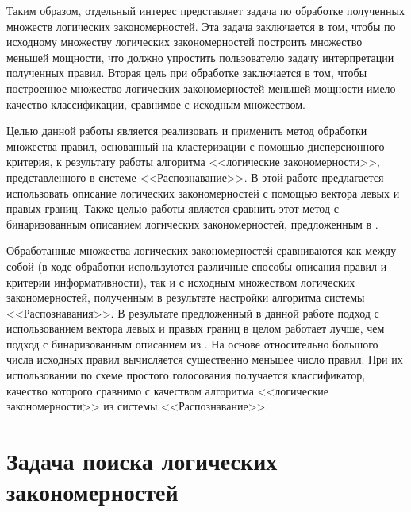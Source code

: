 \documentclass[12pt]{article}
\begin{document}
Таким образом, отдельный интерес представляет задача по обработке
полученных множеств логических закономерностей. Эта задача заключается
в том, чтобы по исходному множеству логических закономерностей
построить множество меньшей мощности, что должно упростить
пользователю задачу интерпретации полученных правил. Вторая цель при
обработке заключается в том, чтобы построенное множество логических
закономерностей меньшей мощности имело качество классификации,
сравнимое с исходным множеством.

Целью данной работы является реализовать и применить метод обработки
множества правил, основанный на кластеризации с помощью дисперсионного
критерия, к результату работы алгоритма <<логические закономерности>>,
представленного в системе <<Распознавание>>. В этой работе
предлагается использовать описание логических закономерностей с
помощью вектора левых и правых границ. Также целью работы является
сравнить этот метод с бинаризованным описанием логических
закономерностей, предложенным в \cite{novikov15}.

Обработанные множества логических закономерностей сравниваются как
между собой (в ходе обработки используются различные способы описания
правил и критерии информативности), так и с исходным множеством
логических закономерностей, полученным в результате настройки
алгоритма системы <<Распознавания>>. В результате предложенный в
данной работе подход с использованием вектора левых и правых границ в
целом работает лучше, чем подход с бинаризованным описанием из
\cite{novikov15}. На основе относительно большого числа исходных
правил вычисляется существенно меньшее число правил. При их
использовании по схеме простого голосования получается классификатор,
качество которого сравнимо с качеством алгоритма <<логические
закономерности>> из системы <<Распознавание>>.

\section{Задача поиска логических закономерностей}


\end{document}
